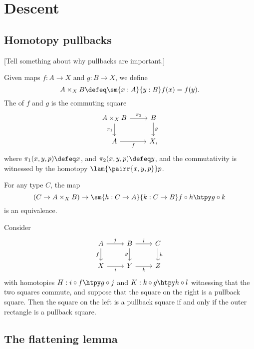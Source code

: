 \documentclass[11pt]{memoir} %
\begin{document}
\chapter{Descent}

\section{Homotopy pullbacks}
[Tell something about why pullbacks are important.]
\begin{defn}
Given maps $f:A\to X$ and $g:B\to X$, we define \[A\times_X B\defeq \sm{x:A}{y:B}f(x)=f(y).\] The  of $f$ and $g$ is the commuting square
\begin{equation*}
\begin{tikzcd}
A\times_X B \arrow[r,"\pi_2"] \arrow[d,swap,"\pi_1"] & B \arrow[d,"g"] \\
A \arrow[r,swap,"f"] & X,
\end{tikzcd}
\end{equation*}
where $\pi_1(x,y,p)\defeq x$, and $\pi_2(x,y,p)\defeq y$, and the commutativity is witnessed by the homotopy $\lam{\pairr{x,y,p}}p$. 
\end{defn}

\begin{thm}
For any type $C$, the map
\begin{equation*}
(C\to A\times_X B)\to \sm{h:C\to A}{k:C\to B}f\circ h\htpy g\circ k
\end{equation*}
is an equivalence.
\end{thm}

\begin{lem}\label{lem:pb_pasting}
Consider 
\begin{equation*}
\begin{tikzcd}
A \arrow[d,swap,"f"] \arrow[r,"j"] & B \arrow[d,swap,"g"] \arrow[r,"l"] & C \arrow[d,"h"] \\
X \arrow[r,swap,"i"] & Y \arrow[r,swap,"k"] & Z
\end{tikzcd}
\end{equation*}
with homotopies $H:i\circ f\htpy g\circ j$ and $K:k\circ g\htpy h\circ l$ witnessing that the two squares commute, and suppose that the square on the right is a pullback square. Then the square on the left is a pullback square if and only if the outer rectangle is a pullback square.
\end{lem}

\section{The flattening lemma}
\end{document}
